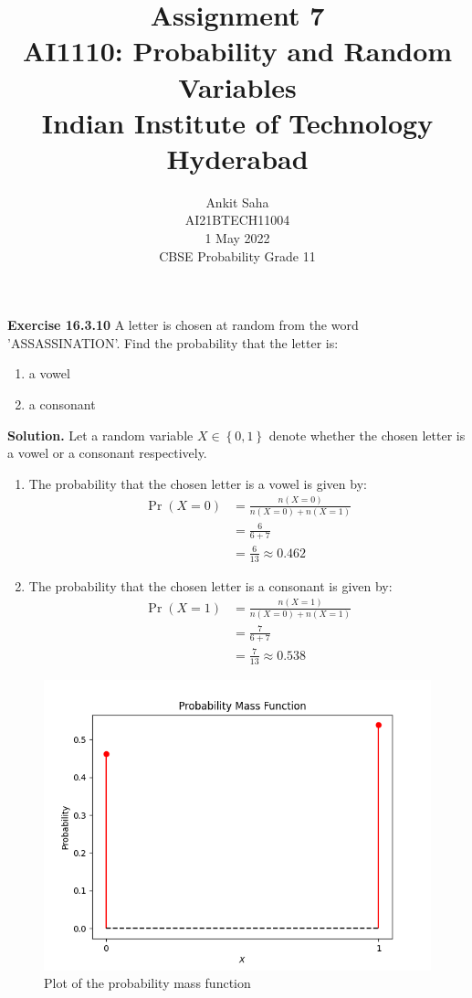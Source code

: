 \documentclass[journal,12pt,twocolumn]{IEEEtran}
\title{Assignment 7 \\ \Large AI1110: Probability and Random Variables \\ \large Indian Institute of Technology Hyderabad}
\author{Ankit Saha \\ \normalsize AI21BTECH11004 \\ \vspace*{20pt} \normalsize  1 May 2022 \\ \vspace*{20pt} \Large CBSE Probability Grade 11}
\providecommand{\pr}[1]{\ensuremath{\Pr\left(#1\right)}}
\providecommand{\cbrak}[1]{\ensuremath{\left\{#1\right\}}}
\begin{document}
	\maketitle
	
	\textbf{Exercise 16.3.10} 
	A letter is chosen at random from the word 'ASSASSINATION'. Find the probability that the letter is:
	\begin{enumerate}[label=(\roman*)]
	\item a vowel
	\item a consonant
	\end{enumerate}	 
	
	\textbf{Solution.}
	Let a random variable $X \in \cbrak{0,1}$ denote whether the chosen letter is a vowel or a consonant respectively.
	\begin{table}[ht!]
		\centering
		
		\caption{}
		\label{table:table1}	
	\end{table}
	
	\begin{enumerate}[label=(\roman*)]
	\item The probability that the chosen letter is a vowel is given by:
	\begin{align}
		\pr{X=0} &= \frac{n(X=0)}{n(X=0)+n(X=1)} \\
		&= \frac{6}{6+7} \\
		&= \frac{6}{13} \approx 0.462
	\end{align}
	
	\item The probability that the chosen letter is a consonant is given by:
	\begin{align}
		\pr{X=1} &= \frac{n(X=1)}{n(X=0)+n(X=1)} \\
		&= \frac{7}{6+7} \\
		&= \frac{7}{13} \approx 0.538
	\end{align}	
	\end{enumerate}
	
	\begin{figure}[!ht]
		\centering
		\includegraphics[width=\columnwidth]{figs/fig-1.png}
		\caption{Plot of the probability mass function}
		\label{fig1}
	\end{figure}
	
\end{document}
